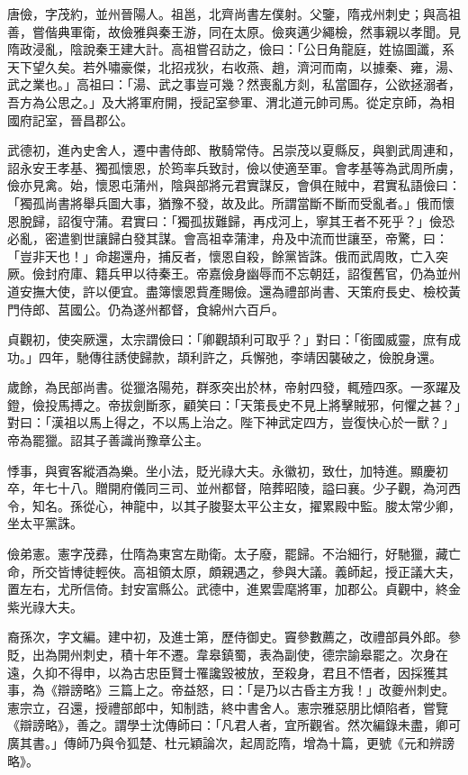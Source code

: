 \begin{pinyinscope}
 唐儉，字茂約，並州晉陽人。祖邕，北齊尚書左僕射。父鑒，隋戎州刺史；與高祖善，嘗偕典軍衛，故儉雅與秦王游，同在太原。儉爽邁少繩檢，然事親以孝聞。見隋政浸亂，陰說秦王建大計。高祖嘗召訪之，儉曰：「公日角龍庭，姓協圖讖，系天下望久矣。若外嘯豪傑，北招戎狄，右收燕、趙，濟河而南，以據秦、雍，湯、武之業也。」高祖曰：「湯、武之事豈可幾？然喪亂方剡，私當圖存，公欲拯溺者，吾方為公思之。」及大將軍府開，授記室參軍、渭北道元帥司馬。從定京師，為相國府記室，晉昌郡公。



 武德初，進內史舍人，遷中書侍郎、散騎常侍。呂崇茂以夏縣反，與劉武周連和，詔永安王孝基、獨孤懷恩，於筠率兵致討，儉以使適至軍。會孝基等為武周所虜，儉亦見禽。始，懷恩屯蒲州，陰與部將元君實謀反，會俱在賊中，君實私語儉曰：「獨孤尚書將舉兵圖大事，猶豫不發，故及此。所謂當斷不斷而受亂者。」俄而懷恩脫歸，詔復守蒲。君實曰：「獨孤拔難歸，再戍河上，寧其王者不死乎？」儉恐必亂，密遣劉世讓歸白發其謀。會高祖幸蒲津，舟及中流而世讓至，帝驚，曰：「豈非天也！」命趨還舟，捕反者，懷恩自殺，餘黨皆誅。俄而武周敗，亡入突厥。儉封府庫、籍兵甲以待秦王。帝嘉儉身幽辱而不忘朝廷，詔復舊官，仍為並州道安撫大使，許以便宜。盡簿懷恩貲產賜儉。還為禮部尚書、天策府長史、檢校黃門侍郎、莒國公。仍為遂州都督，食綿州六百戶。



 貞觀初，使突厥還，太宗謂儉曰：「卿觀頡利可取乎？」對曰：「銜國威靈，庶有成功。」四年，馳傳往誘使歸款，頡利許之，兵懈弛，李靖因襲破之，儉脫身還。



 歲餘，為民部尚書。從獵洛陽苑，群豕突出於林，帝射四發，輒殪四豕。一豕躍及鐙，儉投馬搏之。帝拔劍斷豕，顧笑曰：「天策長史不見上將擊賊邪，何懼之甚？」對曰：「漢祖以馬上得之，不以馬上治之。陛下神武定四方，豈復快心於一獸？」帝為罷獵。詔其子善識尚豫章公主。



 悸事，與賓客縱酒為樂。坐小法，貶光祿大夫。永徽初，致仕，加特進。顯慶初卒，年七十八。贈開府儀同三司、並州都督，陪葬昭陵，謚曰襄。少子觀，為河西令，知名。孫從心，神龍中，以其子脧娶太平公主女，擢累殿中監。脧太常少卿，坐太平黨誅。



 儉弟憲。憲字茂彞，仕隋為東宮左勛衛。太子廢，罷歸。不治細行，好馳獵，藏亡命，所交皆博徒輕俠。高祖領太原，頗親遇之，參與大議。義師起，授正議大夫，置左右，尤所信倚。封安富縣公。武德中，進累雲麾將軍，加郡公。貞觀中，終金紫光祿大夫。



 裔孫次，字文編。建中初，及進士第，歷侍御史。竇參數薦之，改禮部員外郎。參貶，出為開州刺史，積十年不遷。韋皋鎮蜀，表為副使，德宗諭皋罷之。次身在遠，久抑不得申，以為古忠臣賢士罹讒毀被放，至殺身，君且不悟者，因採獲其事，為《辯謗略》三篇上之。帝益怒，曰：「是乃以古昏主方我！」改夔州刺史。憲宗立，召還，授禮部郎中，知制誥，終中書舍人。憲宗雅惡朋比傾陷者，嘗覽《辯謗略》，善之。謂學士沈傳師曰：「凡君人者，宜所觀省。然次編錄未盡，卿可廣其書。」傳師乃與令狐楚、杜元穎論次，起周訖隋，增為十篇，更號《元和辨謗略》。




\end{pinyinscope}
